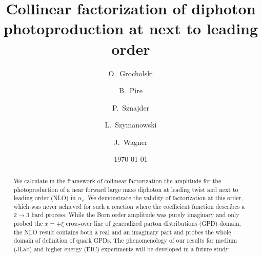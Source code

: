 \documentclass[aps,prd,superscriptaddress,floatfix,showpacs]{revtex4}
\begin{document}
\title
{Collinear factorization of diphoton photoproduction at next to leading order}
\author{O.~Grocholski}
\author{ B.~Pire}
\author{ P.~Sznajder}
\author{ L.~Szymanowski}
\author{ J.~Wagner}
\date{\today}
\begin{abstract}
 We calculate in the framework of collinear factorization the amplitude for the photoproduction of a near forward large mass diphoton at leading twist and next to leading order (NLO) in $\alpha_s$. We demonstrate the validity of factorization at this order, which was never achieved for such a reaction where the coefficient function describes a $2 \to 3$ hard process. While the Born order amplitude was purely imaginary and only probed the $x=\pm \xi$ cross-over line of generalized parton distributions (GPD) domain, the NLO result contains both a real and an imaginary part and probes the whole domain of definition of quark GPDs. The phenomenology of our results for medium (JLab) and higher energy (EIC) experiments will be developed in a  future study.
\end{abstract}
\maketitle

\end{document}
